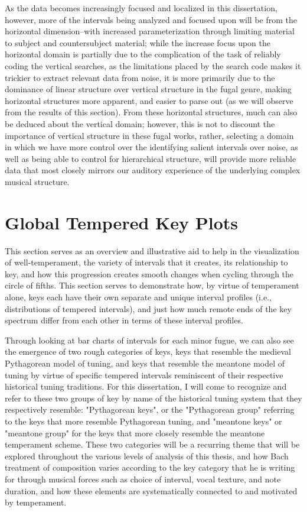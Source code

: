 As the data becomes increasingly focused and localized in this
dissertation, however, more of the intervals being analyzed and focused
upon will be from the horizontal dimension--with increased
parameterization through limiting material to subject and countersubject
material; while the increase focus upon the horizontal domain is
partially due to the complication of the task of reliably coding the
vertical searches, as the limitations placed by the search code makes it
trickier to extract relevant data from noise, it is more primarily due
to the dominance of linear structure over vertical structure in the
fugal genre, making horizontal structures more apparent, and easier to
parse out (as we will observe from the results of this section). From
these horizontal structures, much can also be deduced about the vertical
domain; however, this is not to discount the importance of vertical
structure in these fugal works, rather, selecting a domain in which we
have more control over the identifying salient intervals over noise, as
well as being able to control for hierarchical structure, will provide
more reliable data that most closely mirrors our auditory experience of
the underlying complex musical structure.

    \section{Global Tempered Key Plots}\label{global-tempered-key-plots}

    This section serves as an overview and illustrative aid to help in the
visualization of well-temperament, the variety of intervals that it
creates, its relationship to key, and how this progression creates
smooth changes when cycling through the circle of fifths. This section
serves to demonstrate how, by virtue of temperament alone, keys each
have their own separate and unique interval profiles (i.e.,
distributions of tempered intervals), and just how much remote ends of
the key spectrum differ from each other in terms of these interval
profiles.

Through looking at bar charts of intervals for each minor fugue, we can
also see the emergence of two rough categories of keys, keys that
resemble the medieval Pythagorean model of tuning, and keys that
resemble the meantone model of tuning by virtue of specific tempered
intervals reminiscent of their respective historical tuning traditions.
For this dissertation, I will come to recognize and refer to these two
groups of key by name of the historical tuning system that they
respectively resemble: "Pythagorean keys", or the "Pythagorean group"
referring to the keys that more resemble Pythagorean tuning, and
"meantone keys" or "meantone group" for the keys that more closely
resemble the meantone temperament scheme. These two categories will be a
recurring theme that will be explored throughout the various levels of
analysis of this thesis, and how Bach treatment of composition varies
according to the key category that he is writing for through musical
forces such as choice of interval, vocal texture, and note duration, and
how these elements are systematically connected to and motivated by
temperament.

